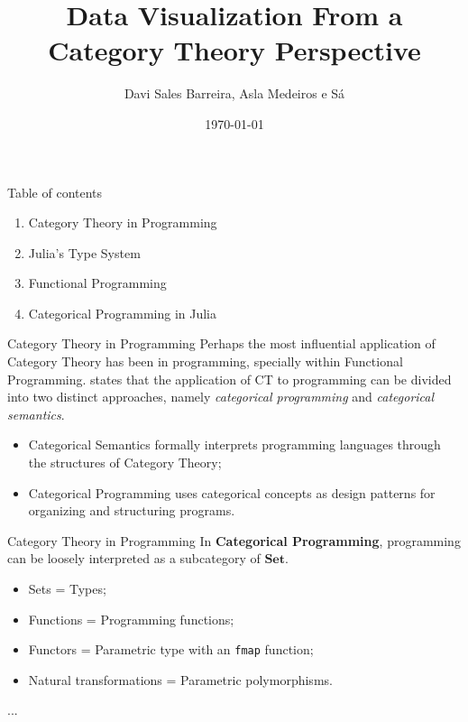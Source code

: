 \documentclass[aspectratio=169,xcolor=dvipsnames,10pt]{beamer}
\title{Data Visualization From a Category Theory Perspective}
\subtitle{}
\author{Davi Sales Barreira, Asla Medeiros e Sá}
\institute
{
    FGV - EMAp, IMPATech
}
\date{\today} %
\newcommand{\pc}[1]{\lstinline[style=juliasmall]{#1}}
\theoremstyle{definition}
\begin{document}
\begin{frame}
    \titlepage
\end{frame}

\begin{frame}{Table of contents}
    \begin{enumerate}
        \item Category Theory in Programming
        \item Julia's Type System
        \item Functional Programming
        \item Categorical Programming in Julia
    \end{enumerate}
\end{frame}

\begin{frame}[fragile]{Category Theory in Programming}
    Perhaps the most influential application of Category Theory has been in
    programming, specially within Functional Programming.
    \citet{orchard2012categorical} states that the application of CT to
    programming can be divided into two distinct approaches, namely
    \textit{categorical programming} and \textit{categorical semantics}.
    \begin{itemize}
        \item Categorical Semantics formally interprets programming languages through the structures of Category Theory;
        \item Categorical Programming uses categorical concepts as design patterns for organizing and structuring programs.
    \end{itemize}
\end{frame}

\begin{frame}[fragile]{Category Theory in Programming}
    In \textbf{Categorical Programming}, programming can be loosely interpreted as a subcategory of $\mathbf{Set}$.
    \begin{itemize}
        \item Sets = Types;
        \item Functions = Programming functions;
        \item Functors = Parametric type with an \pc{fmap} function;
        \item Natural transformations = Parametric polymorphisms.
    \end{itemize}
    ...
\end{frame}
\end{document}
